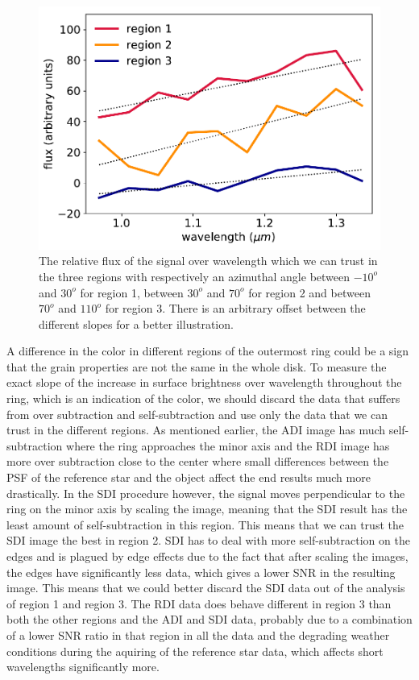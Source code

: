 \documentclass[twoside,single,12pt]{lion-msc}
\begin{document}
\begin{figure}
\vspace{-6mm}
\centering
\includegraphics[width=1\linewidth]{slopedifreg}
\caption{The relative flux of the signal over wavelength which we can trust in the three regions with respectively an azimuthal angle between $-10^o$ and $30^o$ for region 1, between $30^o$ and $70^o$ for region 2 and between $70^o$ and $110^o$ for region 3. There is an arbitrary offset between the different slopes for a better illustration.}
\label{fig:slopedifreg}
\vspace{-4mm}
\end{figure}
A difference in the color in different regions of the outermost ring could be a sign that the grain properties are not the same in the whole disk. To measure the exact slope of the increase in surface brightness over wavelength throughout the ring, which is an indication of the color, we should discard the data that suffers from over subtraction and self-subtraction and use only the data that we can trust in the different regions. As mentioned earlier, the ADI image has much self-subtraction where the ring approaches the minor axis and the RDI image has more over subtraction close to the center where small differences between the PSF of the reference star and the object affect the end results much more drastically. In the SDI procedure however, the signal moves perpendicular to the ring on the minor axis by scaling the image, meaning that the SDI result has the least amount of self-subtraction in this region. This means that we can trust the SDI image the best in region 2. SDI has to deal with more self-subtraction on the edges and is plagued by edge effects due to the fact that after scaling the images, the edges have significantly less data, which gives a lower SNR in the resulting image. This means that we could better discard the SDI data out of the analysis of region 1 and region 3. The RDI data does behave different in region 3 than both the other regions and the ADI and SDI data, probably due to a combination of a lower SNR ratio in that region in all the data and the degrading weather conditions during the aquiring of the reference star data, which affects short wavelengths significantly more.
\bigskip
\end{document}
